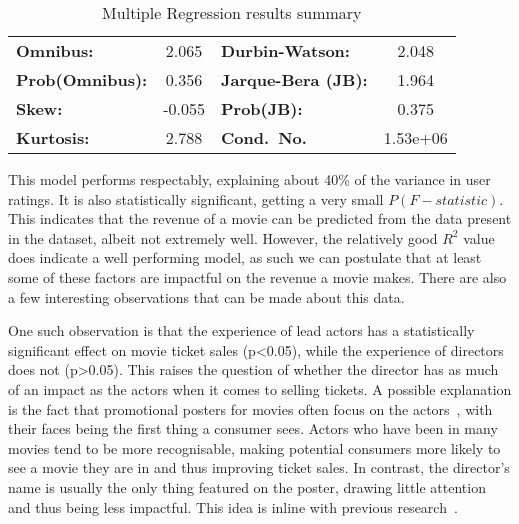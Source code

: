 \begin{table}[H]
\begin{center}
\begin{tabular}{lclc}
                        \textbf{Omnibus:}       & 2.065  & \textbf{  Durbin-Watson:     } & 2.048    \\
                        \textbf{Prob(Omnibus):} & 0.356  & \textbf{  Jarque-Bera (JB):  } & 1.964    \\
                        \textbf{Skew:}          & -0.055 & \textbf{  Prob(JB):          } & 0.375    \\
                        \textbf{Kurtosis:}      & 2.788  & \textbf{  Cond.~No.          } & 1.53e+06 \\
                        \bottomrule
                    \end{tabular}
                \end{center}

                \caption[short]{Multiple Regression results summary}\label{tab:revenue-ols-summary}
            \end{table}
            This model performs respectably, explaining about 40\% of the variance in user
                ratings.
            It is also statistically significant, getting a very small $P(F-statistic)$.
            This indicates that the revenue of a movie can be predicted from the data
                present in the dataset, albeit not extremely well.
            However, the relatively good $R^2$ value does indicate a well performing model,
                as such we can postulate that at least some of these factors are impactful on
                the revenue a movie makes.
            There are also a few interesting observations that can be made about this data.

            One such observation is that the experience of lead actors has a statistically
                significant effect on movie ticket sales (p<0.05), while the experience of
                directors does not (p>0.05).
            This raises the question of whether the director has as much of an impact as
                the actors when it comes to selling tickets.
            A possible explanation is the fact that promotional posters for movies often
                focus on the actors~\cite{label}, with their faces being the first thing a
                consumer sees.
            Actors who have been in many movies tend to be more recognisable, making
                potential consumers more likely to see a movie they are in and thus improving
                ticket sales.
            In contrast, the director's name is usually the only thing featured on the
                poster, drawing little attention and thus being less impactful.
            This idea is inline with previous research~\cite{label}.

